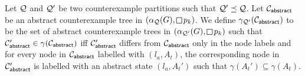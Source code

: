Let $\mathcal{Q}$ and $\mathcal{Q}'$ be two counterexample partitions such that $\mathcal{Q}' \preceq \mathcal{Q}$. Let $\mathcal{C}_{\mathsf{abstract}}$ be an abstract counterexample  tree in $(\alpha_\part(G),\LTLglobally p_k)$. We define $\gamma_{\mathcal{Q}'}(\mathcal{C}_{\mathsf{abstract}})$ to be the set of abstract counterexample trees in $(\alpha_{\part'}(G),\LTLglobally p_k)$ such that $\mathcal{C}'_{\mathsf{abstract}} \in \gamma(\mathcal{C}_{\mathsf{abstract}})$ iff $\mathcal{C}'_{\mathsf{abstract}}$ differs from $\mathcal{C}_{\mathsf{abstract}}$ only in the node labels and for every node in $\mathcal{C}_{\mathsf{abstract}}$ labelled with $(l_a,A_t)$, the corresponding node in $\mathcal{C}'_{\mathsf{abstract}}$ is labelled with an abstract state $(l_a,A_t')$ such that $\gamma(A_t') \subseteq \gamma(A_t)$.
 
